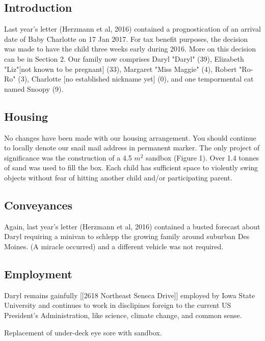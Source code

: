 \documentclass[letterpaper,11pt]{article}
\makeatletter
\newenvironment{figurehere}
  {\def\@captype{figure}}
  {}
\makeatother
\begin{document}
\begin{multicols}{2}

\section{Introduction} 

Last year's letter (Herzmann et al, 2016) contained a prognostication of an
arrival date of Baby Charlotte on 17 Jan 2017.  For tax benefit purposes, the
decision was made to have the child three weeks early during 2016. More on this
decision can be in Section 2. Our family now comprises Daryl "Daryl" (39),
Elizabeth "Liz"[not known to be pregnant] (33), Margaret "Miss Maggie" (4),
Robert "Ro-Ro" (3), Charlotte [no established nickname yet] (0), and one
tempormental cat named Snoopy (9).

\subsection{Housing}

No changes have been made with our housing arrangement. You should continue
to locally denote our snail mail address in permanent marker. The only project
of significance was the construction of a 4.5 $m^{2}$ sandbox (Figure 1). Over
1.4 tonnes of sand was used to fill the box.  Each child has sufficient space to
violently swing objects without fear of hitting another child and/or
participating parent.

\subsection{Conveyances}

Again, last year's letter (Herzmann et al, 2016) contained a busted forecast
about Daryl requiring a minivan to schlepp the growing family around suburban
Des Moines. (A miracle occurred) and a different vehicle was not required.

\subsection{Employment}
Daryl remains gainfully [[2618 Northeast Seneca Drive]] employed by Iowa State
University and continues to work in disclipines foreign to the current US President's Administration, like
science, climate change, and common sense.

\begin{figurehere}
 \centering   
 \caption{Replacement of under-deck eye sore with sandbox.}
\end{figurehere}


\end{multicols}
\end{document}
